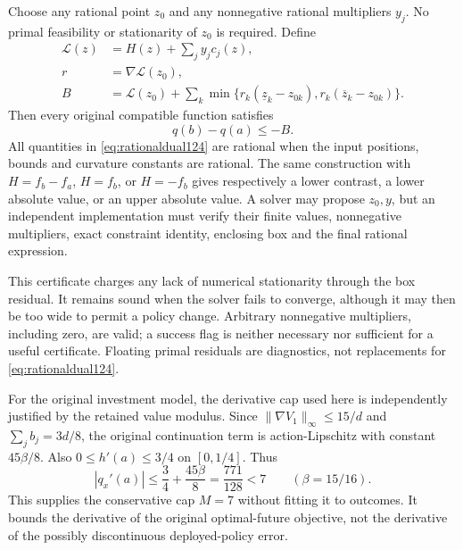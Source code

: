 \begin{theorem}
\label{thm:dualcertificate124}
Choose any rational point $z_0$ and any nonnegative rational multipliers
$y_j$. No primal feasibility or stationarity of $z_0$ is required.
Define
\begin{align}
 \mathcal L(z)&=H(z)+\sum_j y_jc_j(z),\nonumber\\
 r&=\nabla\mathcal L(z_0),\nonumber\\
 B&=\mathcal L(z_0)+
   \sum_k\min\{r_k(\underline z_k-z_{0k}),
                    r_k(\overline z_k-z_{0k})\}.
 \label{eq:rationaldual124}
\end{align}
Then every original compatible function satisfies
\begin{equation}\label{eq:verifiedcontrast124}
                    q(b)-q(a)\le -B.
\end{equation}
All quantities in \eqref{eq:rationaldual124} are rational when the
input positions, bounds and curvature constants are rational. The same
construction with $H=f_b-f_a$, $H=f_b$, or $H=-f_b$ gives respectively
a lower contrast, a lower absolute value, or an upper absolute value.
A solver may propose $z_0,y$, but an independent implementation must
verify their finite values, nonnegative multipliers, exact constraint
identity, enclosing box and the final rational expression.
\end{theorem}

This certificate charges any lack of numerical stationarity through
the box residual. It remains sound when the solver fails to converge,
although it may then be too wide to permit a policy change. Arbitrary
nonnegative multipliers, including zero, are valid; a success flag is
neither necessary nor sufficient for a useful certificate. Floating
primal residuals are diagnostics, not replacements for
\eqref{eq:rationaldual124}.

For the original investment model, the derivative cap used here is
independently justified by the retained value modulus. Since
$\|\nabla V_1\|_\infty\le15/d$ and
$\sum_j b_j=3d/8$, the original continuation term is action-Lipschitz
with constant $45\beta/8$. Also $0\le h'(a)\le3/4$ on
$[0,1/4]$. Thus
\[
 |q_x'(a)|\le \frac34+\frac{45\beta}{8}
      =\frac{771}{128}<7
 \qquad(\beta=15/16).
\]
This supplies the conservative cap $M=7$ without fitting it to outcomes.
It bounds the derivative of the original optimal-future objective, not
the derivative of the possibly discontinuous deployed-policy error.

